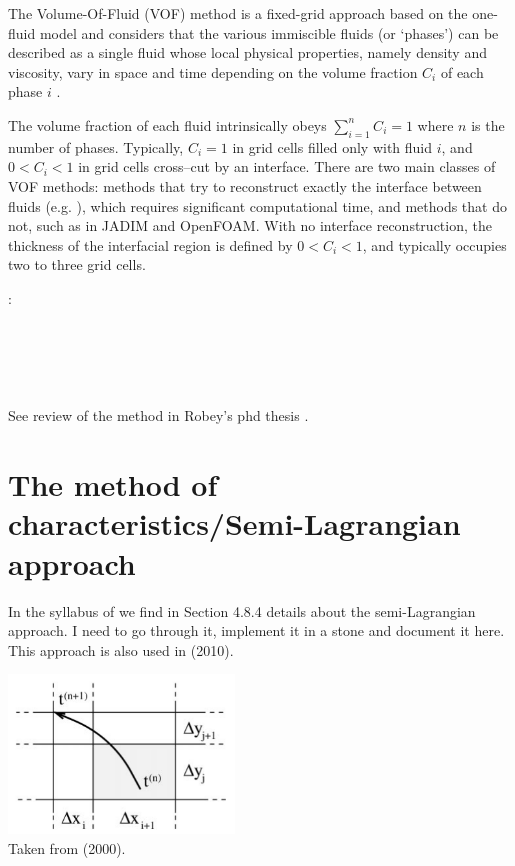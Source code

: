 The Volume-Of-Fluid (VOF) method is a fixed-grid approach based on the one-fluid model 
and considers that the various immiscible fluids (or `phases') can be described as a 
single fluid whose local physical properties, namely density and viscosity, vary in space 
and time depending on the volume fraction $C_i$ of each phase $i$ 
\cite{hini81,youn82}. 

The volume fraction of each fluid intrinsically obeys $\sum \limits_{{i=1}}^n C_i = 1$ where $n$ is the number of phases. 
Typically, $C_i=1$ in grid cells filled only with fluid $i$, and $0<C_i<1$ in grid cells cross--cut by an interface. 
There are two main classes of VOF methods: methods that try to reconstruct exactly the interface between fluids (e.g. \cite{puth18}), which requires significant computational time, and methods that do not, such as in JADIM and OpenFOAM. 
With no interface reconstruction, the thickness of the interfacial region is defined by $0<C_i<1$, and typically occupies two to three grid cells. 

\Literature:\\
\textcite{hini81}\\
\textcite{dusm13}\\
\textcite{ropu19}\\
\textcite{logb20}\\
\textcite{lobg22}\\

See review of the method in Robey's phd thesis \cite{robe19}.

\section{The method of characteristics/Semi-Lagrangian approach}


In the syllabus of \textcite{beka} we find in Section 4.8.4 details 
about the semi-Lagrangian approach.
{\color{red} I need to go through it, implement it in a stone
and document it here.}
This approach is also used in \textcite{bepo10} (2010).


\begin{center}
\includegraphics[width=6cm]{images/tracking/devv00a}\\
{\captionfont Taken from \textcite{devv00a} (2000).}
\end{center}

